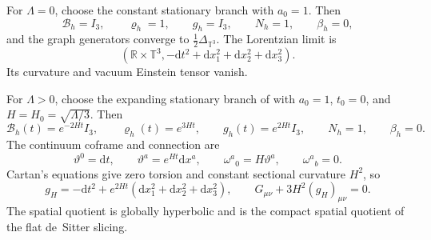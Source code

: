 \documentclass[11pt]{article}
\numberwithin{equation}{section}
\theoremstyle{definition}
\theoremstyle{remark}
\newcommand{\R}{\mathbb R}
\newcommand{\dd}{\mathrm d}
\begin{document}
For $\Lambda=0$, choose the constant stationary branch with $a_0=1$.
Then
\begin{equation}
 \mathcal B_h=I_3,
 \qquad \varrho_h=1,
 \qquad g_h=I_3,
 \qquad N_h=1,
 \qquad \beta_h=0,
 \label{eq:flat-adm-main}
\end{equation}
and the graph generators converge to $\tfrac12\Delta_{\mathbb T^3}$.  The
Lorentzian limit is
\begin{equation}
 (\R\times\mathbb T^3,
 -\dd t^2+\dd x_1^2+\dd x_2^2+\dd x_3^2).
 \label{eq:flat-metric-main}
\end{equation}
Its curvature and vacuum Einstein tensor vanish.

For $\Lambda>0$, choose the expanding stationary branch of
 with $a_0=1$, $t_0=0$, and
$H=H_0=\sqrt{\Lambda/3}$.  Then
\begin{equation}
 \mathcal B_h(t)=e^{-2Ht}I_3,
 \qquad
 \varrho_h(t)=e^{3Ht},
 \qquad
 g_h(t)=e^{2Ht}I_3,
 \qquad
 N_h=1,
 \qquad
 \beta_h=0.
 \label{eq:desitter-adm-main}
\end{equation}
The continuum coframe and connection are
\begin{equation}
 \vartheta^0=\dd t,
 \qquad
 \vartheta^a=e^{Ht}\dd x^a,
 \qquad
 \omega^a{}_0=H\vartheta^a,
 \qquad
 \omega^a{}_b=0.
 \label{eq:desitter-cartan-main}
\end{equation}
Cartan's equations give zero torsion and constant sectional curvature $H^2$,
so
\begin{equation}
 g_H=-\dd t^2+e^{2Ht}
 (\dd x_1^2+\dd x_2^2+\dd x_3^2),
 \qquad
 G_{\mu\nu}+3H^2(g_H)_{\mu\nu}=0.
 \label{eq:desitter-einstein-main}
\end{equation}
The spatial quotient is globally hyperbolic and is the compact spatial quotient
of the flat de~Sitter slicing.
\end{document}
